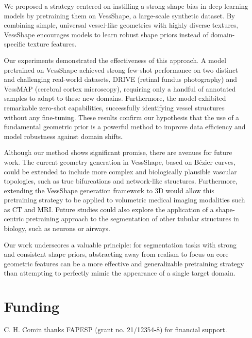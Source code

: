 \documentclass[%
reprint,
nofootinbib,
 amsmath,amssymb,
aps,
superscriptaddress,
showkeys,
longbibliography
]{revtex4-1}
\begin{document}
We proposed a strategy centered on instilling a strong shape bias in deep learning models by pretraining them on VessShape, a large-scale synthetic dataset. By combining simple, universal vessel-like geometries with highly diverse textures, VessShape encourages models to learn robust shape priors instead of domain-specific texture features.

Our experiments demonstrated the effectiveness of this approach. A model pretrained on VessShape achieved strong few-shot performance on two distinct and challenging real-world datasets, DRIVE (retinal fundus photography) and VessMAP (cerebral cortex microscopy), requiring only a handful of annotated samples to adapt to these new domains. Furthermore, the model exhibited remarkable zero-shot capabilities, successfully identifying vessel structures without any fine-tuning. These results confirm our hypothesis that the use of a fundamental geometric prior is a powerful method to improve data efficiency and model robustness against domain shifts.

Although our method shows significant promise, there are avenues for future work. The current geometry generation in VessShape, based on Bézier curves, could be extended to include more complex and biologically plausible vascular topologies, such as true bifurcations and network-like structures. Furthermore, extending the VessShape generation framework to 3D would allow this pretraining strategy to be applied to volumetric medical imaging modalities such as CT and MRI. Future studies could also explore the application of a shape-centric pretraining approach to the segmentation of other tubular structures in biology, such as neurons or airways.

Our work underscores a valuable principle: for segmentation tasks with strong and consistent shape priors, abstracting away from realism to focus on core geometric features can be a more effective and generalizable pretraining strategy than attempting to perfectly mimic the appearance of a single target domain.




\section*{Funding}
C. H. Comin thanks FAPESP (grant no. 21/12354-8) for financial support. 



\end{document}
